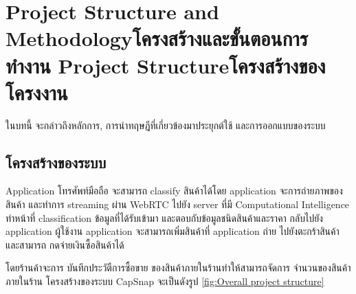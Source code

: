 \chapter{\ifproject%
\ifenglish Project Structure and Methodology\else โครงสร้างและขั้นตอนการทำงาน\fi
\else%
\ifenglish Project Structure\else โครงสร้างของโครงงาน\fi
\fi
}

ในบทนี้ จะกล่าวถึงหลักการ,  การนําทฤษฎีที่เกี่ยวข้องมาประยุกต์ใช้  และการออกแบบของระบบ


\makeatletter


\makeatother
\section{โครงสร้างของระบบ}

Application โทรศัพท์มือถือ จะสามารถ classify สินค้าได้โดย application จะการถ่ายภาพของสินค้า และทำการ streaming ผ่าน WebRTC 
ไปยัง server ที่มี Computational Intelligence ทำหน้าที่ classification ข้อมูลที่ได้รับเข้ามา  และตอบกับข้อมูลชนิดสินค้าและราคา กลับไปยัง application
ผู้ใช้งาน application จะสามารถเพิ่มสินค้าที่ application ถ่าย ไปยังตะกร้าสินค้า และสามารถ กดจ่ายเงินซื้อสินค้าได้

 โดยร้านค้าจะการ บันทึกประวัตืการซื้อขาย ของสินค้าภายในร้านทำให้สามารถจัดการ จำนวนของสินค้าภายในร้าน โครงสร้างของระบบ CapSnap จะเป็นดังรูป \ref{fig:Overall project structure}



